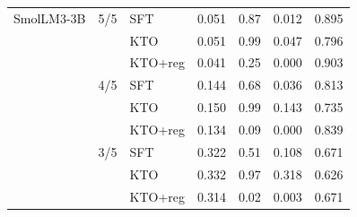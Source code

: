 \begin{table}[t]
\begin{tabular}{lllrrrr}
\addlinespace
SmolLM3-3B & 5/5 & SFT & 0.051 & 0.87 & 0.012 & 0.895 \\
 &  & KTO & 0.051 & 0.99 & 0.047 & 0.796 \\
 &  & KTO+reg & 0.041 & 0.25 & 0.000 & 0.903 \\
 & 4/5 & SFT & 0.144 & 0.68 & 0.036 & 0.813 \\
 &  & KTO & 0.150 & 0.99 & 0.143 & 0.735 \\
 &  & KTO+reg & 0.134 & 0.09 & 0.000 & 0.839 \\
 & 3/5 & SFT & 0.322 & 0.51 & 0.108 & 0.671 \\
 &  & KTO & 0.332 & 0.97 & 0.318 & 0.626 \\
 &  & KTO+reg & 0.314 & 0.02 & 0.003 & 0.671 \\
\bottomrule
\end{tabular}
\end{table}
